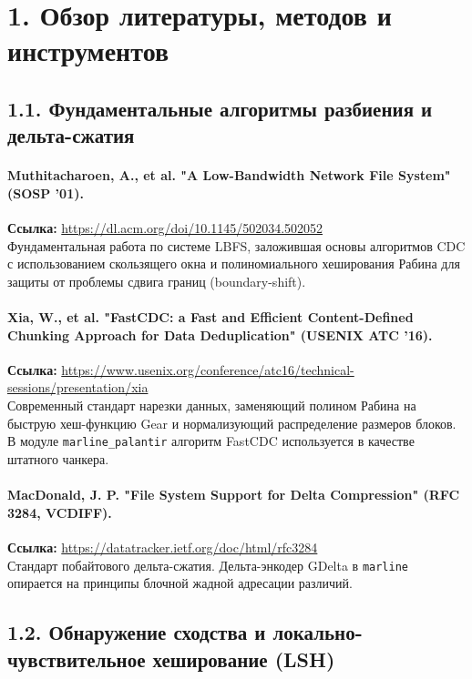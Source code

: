 \documentclass[a4paper,14pt]{extarticle}
\begin{document}
\newpage

\section*{1. Обзор литературы, методов и инструментов}

\subsection*{1.1. Фундаментальные алгоритмы разбиения и дельта-сжатия}

\paragraph{Muthitacharoen, A., et al. "A Low-Bandwidth Network File System" (SOSP '01).}
\textbf{Ссылка:} \url{https://dl.acm.org/doi/10.1145/502034.502052} \\
Фундаментальная работа по системе LBFS, заложившая основы алгоритмов CDC с использованием скользящего окна и полиномиального хеширования Рабина для защиты от проблемы сдвига границ (boundary-shift).

\paragraph{Xia, W., et al. "FastCDC: a Fast and Efficient Content-Defined Chunking Approach for Data Deduplication" (USENIX ATC '16).}
\textbf{Ссылка:} \url{https://www.usenix.org/conference/atc16/technical-sessions/presentation/xia} \\
Современный стандарт нарезки данных, заменяющий полином Рабина на быструю хеш-функцию Gear и нормализующий распределение размеров блоков. В модуле \texttt{marline\_palantir} алгоритм FastCDC используется в качестве штатного чанкера.

\paragraph{MacDonald, J. P. "File System Support for Delta Compression" (RFC 3284, VCDIFF).}
\textbf{Ссылка:} \url{https://datatracker.ietf.org/doc/html/rfc3284} \\
Стандарт побайтового дельта-сжатия. Дельта-энкодер GDelta в \texttt{marline} опирается на принципы блочной жадной адресации различий.

\subsection*{1.2. Обнаружение сходства и локально-чувствительное хеширование (LSH)}
\end{document}
